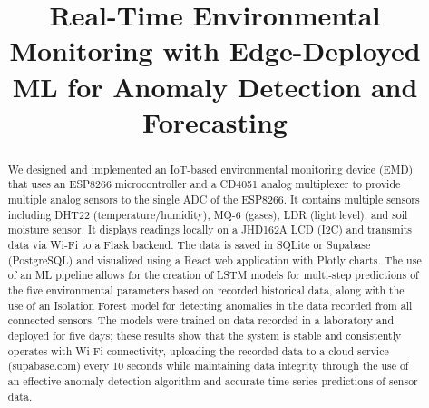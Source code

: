 \documentclass[journal,onecolumn]{IEEEtran}
\begin{document}
\title{Real-Time Environmental Monitoring with Edge-Deployed ML for Anomaly Detection and Forecasting}

\author{
}
\maketitle
\onecolumn

\begin{abstract}
We designed and implemented an IoT-based environmental monitoring device (EMD) that uses an ESP8266 microcontroller and a CD4051 analog multiplexer to provide multiple analog sensors to the single ADC of the ESP8266. It contains multiple sensors including DHT22 (temperature/humidity), MQ-6 (gases), LDR (light level), and soil moisture sensor. It displays readings locally on a JHD162A LCD (I2C) and transmits data via Wi-Fi to a Flask backend. The data is saved in SQLite or Supabase (PostgreSQL) and visualized using a React web application with Plotly charts. The use of an ML pipeline allows for the creation of LSTM models for multi-step predictions of the five environmental parameters based on recorded historical data, along with the use of an Isolation Forest model for detecting anomalies in the data recorded from all connected sensors. The models were trained on data recorded in a laboratory and deployed for five days; these results show that the system is stable and consistently operates with Wi-Fi connectivity, uploading the recorded data to a cloud service (supabase.com) every 10 seconds while maintaining data integrity through the use of an effective anomaly detection algorithm and accurate time-series predictions of sensor data.
\end{abstract}
\end{document}
